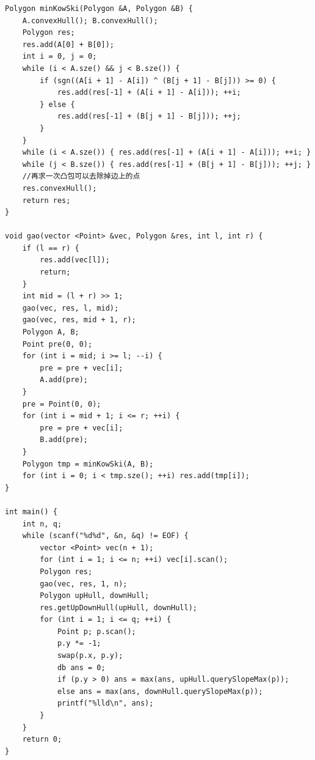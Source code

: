 \begin{lstlisting}
Polygon minKowSki(Polygon &A, Polygon &B) {
	A.convexHull(); B.convexHull();
	Polygon res;
	res.add(A[0] + B[0]); 
	int i = 0, j = 0;
	while (i < A.sze() && j < B.sze()) {
		if (sgn((A[i + 1] - A[i]) ^ (B[j + 1] - B[j])) >= 0) {
			res.add(res[-1] + (A[i + 1] - A[i])); ++i;
		} else {
			res.add(res[-1] + (B[j + 1] - B[j])); ++j;
		}
	}
	while (i < A.sze()) { res.add(res[-1] + (A[i + 1] - A[i])); ++i; }
	while (j < B.sze()) { res.add(res[-1] + (B[j + 1] - B[j])); ++j; }
	//再求一次凸包可以去除掉边上的点
	res.convexHull();
	return res;
}

void gao(vector <Point> &vec, Polygon &res, int l, int r) { 
	if (l == r) {
		res.add(vec[l]);
		return;
	}
	int mid = (l + r) >> 1;
	gao(vec, res, l, mid);
	gao(vec, res, mid + 1, r);
	Polygon A, B;
	Point pre(0, 0);
	for (int i = mid; i >= l; --i) {
		pre = pre + vec[i]; 
		A.add(pre);
	}
	pre = Point(0, 0);
	for (int i = mid + 1; i <= r; ++i) {
		pre = pre + vec[i];
		B.add(pre);
	}
	Polygon tmp = minKowSki(A, B);
	for (int i = 0; i < tmp.sze(); ++i) res.add(tmp[i]);
}

int main() {
	int n, q; 
	while (scanf("%d%d", &n, &q) != EOF) {
		vector <Point> vec(n + 1);
		for (int i = 1; i <= n; ++i) vec[i].scan();
		Polygon res;
		gao(vec, res, 1, n);
		Polygon upHull, downHull;
		res.getUpDownHull(upHull, downHull);
		for (int i = 1; i <= q; ++i) {
			Point p; p.scan();
			p.y *= -1; 
			swap(p.x, p.y);
			db ans = 0;
			if (p.y > 0) ans = max(ans, upHull.querySlopeMax(p));
			else ans = max(ans, downHull.querySlopeMax(p));
			printf("%lld\n", ans);
		}
	}
	return 0;
}
\end{lstlisting}






